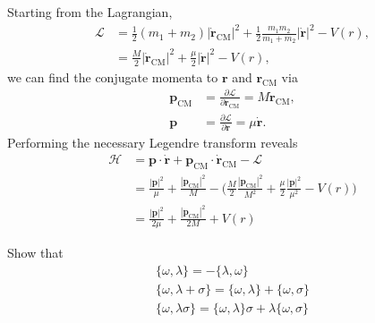 \documentclass[../principles-of-quantum-mechanics.tex]{subfiles}
\begin{document}
\begin{questions}
		\begin{solution}
			Starting from the Lagrangian,
			\begin{align*}
				\mathcal{L} &= \frac{1}{2}(m_1+m_2)|\dot{\mathbf{r}}_{\mathrm{CM}}|^2 + \frac{1}{2}\frac{m_1m_2}{m_1+m_2}|\dot{\mathbf{r}}|^2 - V(r), \\
				&= \frac{M}{2}|\dot{\mathbf{r}}_{\mathrm{CM}}|^2 + \frac{\mu}{2}|\dot{\mathbf{r}}|^2 - V(r),
			\end{align*}
			we can find the conjugate momenta to $\mathbf{r}$ and $\mathbf{r}_{\mathrm{CM}}$ via
			\begin{align*}
				\mathbf{p}_{\mathrm{CM}} &= \frac{\partial\mathcal{L}}{\partial\dot{\mathbf{r}}_{\mathrm{CM}}} = M\dot{\mathbf{r}}_{\mathrm{CM}}, \\
				\mathbf{p} &= \frac{\partial\mathcal{L}}{\partial\dot{\mathbf{r}}} = \mu\dot{\mathbf{r}}.
			\end{align*}
			Performing the necessary Legendre transform reveals
			\begin{align*}
				\mathcal{H} &= \mathbf{p}\cdot\dot{\mathbf{r}} + \mathbf{p}_{\mathrm{CM}}\cdot\dot{\mathbf{r}}_{\mathrm{CM}} - \mathcal{L} \\
				&= \frac{|\mathbf{p}|^2}{\mu} + \frac{|\mathbf{p}_{\mathrm{CM}}|^2}{M} - \Big(\frac{M}{2}\frac{|\mathbf{p}_{\mathrm{CM}}|^2}{M^2} + \frac{\mu}{2}\frac{|\mathbf{p}|^2}{\mu^2} - V(r)\Big) \\
				&= \frac{|\mathbf{p}|^2}{2\mu} + \frac{|\mathbf{p}_{\mathrm{CM}}|^2}{2M} + V(r)
			\end{align*}
		\end{solution}
	
		\question Show that
		\begin{gather*}
			\{\omega, \lambda\} = -\{\lambda, \omega\} \\
			\{\omega, \lambda + \sigma\} = \{\omega, \lambda\} + \{\omega, \sigma\} \\
			\{\omega, \lambda\sigma\} = \{\omega, \lambda\}\sigma + \lambda\{\omega, \sigma\}
		\end{gather*}
		

\end{questions}
\end{document}
